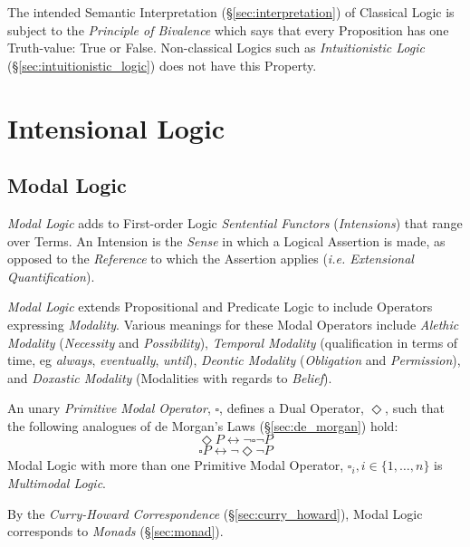 The intended Semantic Interpretation (\S\ref{sec:interpretation})
of Classical Logic is subject to the \emph{Principle of Bivalence}
which says that every Proposition has one Truth-value: True or False.
Non-classical Logics such as \emph{Intuitionistic Logic}
(\S\ref{sec:intuitionistic_logic}) does not have this Property.



\section{Intensional Logic}\label{sec:intensional_logic}

\subsection{Modal Logic}\label{sec:modal_logic}

\emph{Modal Logic} adds to First-order Logic \emph{Sentential
  Functors} (\emph{Intensions}) that range over Terms. An Intension is
the \emph{Sense} in which a Logical Assertion is made, as opposed to
the \emph{Reference} to which the Assertion applies (\emph{i.e.
  Extensional Quantification}).

\emph{Modal Logic} extends Propositional and Predicate Logic to
include Operators expressing \emph{Modality}. Various meanings for
these Modal Operators include \emph{Alethic Modality}
(\emph{Necessity} and \emph{Possibility}), \emph{Temporal Modality}
(qualification in terms of time, eg \emph{always}, \emph{eventually},
\emph{until}), \emph{Deontic Modality} (\emph{Obligation} and
\emph{Permission}), and \emph{Doxastic Modality} (Modalities with
regards to \emph{Belief}).

An unary \emph{Primitive Modal Operator}, $\square$, defines a Dual
Operator, $\Diamond$, such that the following analogues of de Morgan's
Laws (\S\ref{sec:de_morgan}) hold:
    \[\Diamond P \leftrightarrow \neg \square \neg P\]
    \[\square P \leftrightarrow \neg \Diamond \neg P\]
Modal Logic with more than one Primitive Modal Operator, $\square _i,
i \in \{1, \ldots, n\}$ is \emph{Multimodal Logic}.

By the \emph{Curry-Howard Correspondence}
(\S\ref{sec:curry_howard}), Modal Logic corresponds
to \emph{Monads} (\S\ref{sec:monad}).



